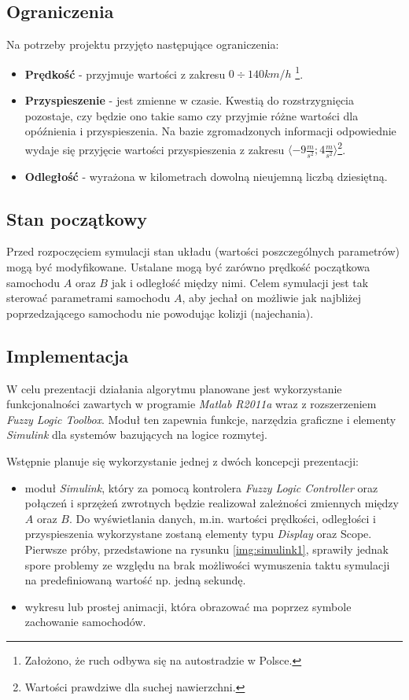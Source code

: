 \documentclass[11pt,a4paper]{article}
\begin{document}
\subsection{Ograniczenia}
Na potrzeby projektu przyjęto następujące ograniczenia:
\begin{itemize}
\item \textbf{Prędkość} - przyjmuje wartości z zakresu $0\div140km/h$ \footnote{Założono, że ruch odbywa się na autostradzie w Polsce.}.
\item \textbf{Przyspieszenie} - jest zmienne w czasie. Kwestią do rozstrzygnięcia pozostaje, czy będzie ono takie samo czy przyjmie różne wartości dla opóźnienia i przyspieszenia. Na bazie zgromadzonych informacji odpowiednie wydaje się przyjęcie wartości przyspieszenia z zakresu $\langle-9\frac{m}{s^2};4\frac{m}{s^2}\rangle$\footnote{Wartości prawdziwe dla suchej nawierzchni.}.
\item \textbf{Odległość} - wyrażona w kilometrach dowolną nieujemną liczbą dziesiętną.
\end{itemize}

\subsection{Stan początkowy}
Przed rozpoczęciem symulacji stan układu (wartości poszczególnych parametrów) mogą być modyfikowane. Ustalane mogą być zarówno prędkość początkowa samochodu $A$ oraz $B$ jak i odległość między nimi. Celem symulacji jest tak sterować parametrami samochodu $A$, aby jechał on możliwie jak najbliżej poprzedzającego samochodu nie powodując kolizji (najechania).

\subsection{Implementacja}
W celu prezentacji działania algorytmu planowane jest wykorzystanie funkcjonalności zawartych w programie \emph{Matlab R2011a} wraz z rozszerzeniem \emph{Fuzzy Logic Toolbox}. Moduł ten zapewnia funkcje, narzędzia graficzne i elementy \emph{Simulink} dla systemów bazujących na logice rozmytej.

Wstępnie planuje się wykorzystanie jednej z dwóch koncepcji prezentacji:
\begin{itemize}
	\item moduł \emph{Simulink}, który za pomocą kontrolera \emph{Fuzzy Logic Controller} oraz połączeń i sprzężeń zwrotnych będzie realizował zależności zmiennych między $A$ oraz $B$. Do wyświetlania danych, m.in. wartości prędkości, odległości i przyspieszenia wykorzystane zostaną elementy typu \emph{Display} oraz {Scope}. Pierwsze próby, przedstawione na rysunku \ref{img:simulink1}, sprawiły jednak spore problemy ze względu na brak możliwości wymuszenia taktu symulacji na predefiniowaną wartość np. jedną sekundę.
	\item wykresu lub prostej animacji, która obrazować ma poprzez symbole zachowanie samochodów.
\end{itemize}
\end{document}
